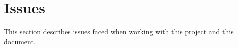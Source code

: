 \section{Issues}
This section describes issues faced when working with this project and this document.
